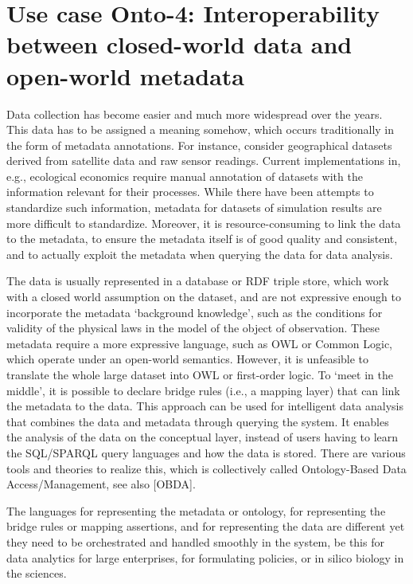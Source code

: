 \documentclass[10pt,fleqn,%
\ifpretendfinal
final%
\else
draft%
\fi,
]{scrreprt}
\newcommand*{\termref}[1]{\index{#1}#1\xspace}
\begin{document}
 

\section{Use case Onto-4: Interoperability between closed-world data and open-world metadata}
Data collection has become easier and much more widespread over the years. This data has to be 
assigned a meaning somehow, which occurs traditionally in the  form of metadata annotations. For 
instance, consider geographical datasets derived from satellite data and raw sensor readings. 
Current implementations in, e.g., ecological economics\cite{bagstad_aries_2011} require manual 
annotation of datasets with the information relevant for their processes. While there have been 
attempts to standardize such information\cite{european_comission_inspire_2014}, metadata for 
datasets of simulation results are more difficult to standardize. Moreover, it is 
resource-consuming to link the data to the metadata, to ensure the metadata itself is of good 
quality and consistent, and to actually exploit the metadata when querying the data for data 
analysis. 

The data is usually represented in a database or RDF triple store, which work with a \termref{closed world assumption} on the dataset, and are not expressive enough to 
incorporate the metadata `background knowledge', such as the conditions for validity of the physical laws in the model of the object of observation. These metadata 
require a more expressive language, such as OWL or Common Logic, which operate under an open-world semantics. However, it is unfeasible to translate the 
whole large dataset into OWL or first-order logic. To `meet in the middle', it is possible to declare bridge rules (i.e., a mapping layer) that can link the metadata to 
the data. This approach can be used for intelligent data analysis that combines the data and metadata through querying the system. It enables the analysis of the 
data on the conceptual layer, instead of users having to learn the SQL/SPARQL query languages and how the data is stored. There are various tools and theories 
to realize this, which is collectively called Ontology-Based Data Access/Management, see also [OBDA].

The languages for representing the metadata or ontology, for representing the bridge rules or mapping assertions, and for representing the data are different yet 
they need to be orchestrated and handled smoothly in the system, be this for data analytics for large enterprises, for formulating policies, or in silico biology in the 
sciences. 
\end{document}
